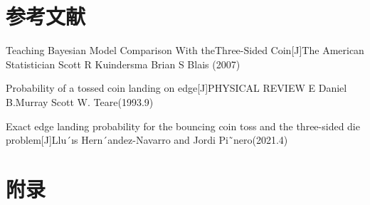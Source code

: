 \documentclass[UTF8]{gapd}
\begin{document}
\section*{参考文献}
\begin{thebibliography}{2}

Teaching Bayesian Model Comparison With theThree-Sided Coin[J]The American Statistician Scott R Kuindersma  Brian S Blais (2007)

Probability of a tossed coin landing on edge[J]PHYSICAL REVIEW E Daniel B.Murray  Scott W. Teare(1993.9)

Exact edge landing probability for the bouncing coin toss and the three-sided die problem[J]Llu´ıs Hern´andez-Navarro and Jordi Pi˜nero(2021.4)
\end{thebibliography}
\section{附录}
\end{document}
